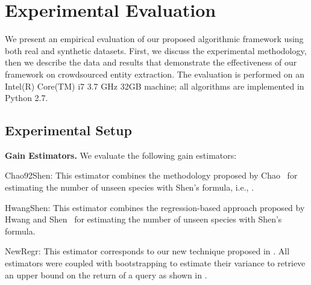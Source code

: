 

\section{Experimental Evaluation}
\label{sec:exps}
We present an empirical evaluation of our proposed algorithmic framework using both real and synthetic datasets. First, we discuss the experimental methodology, then we describe the data and results that demonstrate the effectiveness of our framework on crowdsourced entity extraction. The evaluation is performed on an Intel(R) Core(TM) i7 3.7 GHz 32GB machine; all algorithms are implemented in Python 2.7. 

\subsection{Experimental Setup}
\label{sec:expsetup}
\vspace{2pt}\noindent\textbf{Gain Estimators.} We evaluate the following gain estimators:
\squishlist
\item Chao92Shen: This estimator combines the methodology proposed by Chao~\cite{chao:1992} for estimating the number of unseen species  with Shen's formula, i.e., .
\item HwangShen: This estimator combines the regression-based approach proposed by Hwang and Shen~\cite{hwang:2010} for estimating the number of unseen species with Shen's formula. 
\item NewRegr: This estimator corresponds to our new technique proposed in .
\squishend
All estimators were coupled with bootstrapping to estimate their variance to retrieve an upper bound on the return of a query as shown in .

